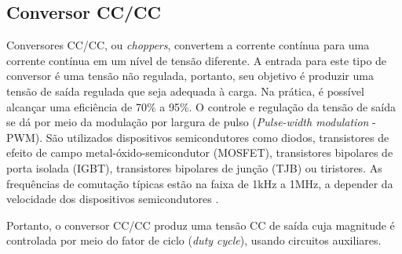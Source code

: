     
    
    
    
    

\subsection{Conversor CC/CC}

Conversores CC/CC, ou \textit{choppers}, convertem a corrente contínua para uma corrente contínua em um nível de tensão diferente. A entrada para este tipo de conversor é uma tensão não regulada, portanto, seu objetivo é produzir uma tensão de saída regulada que seja adequada à carga. Na prática, é possível alcançar uma eficiência de 70\% a 95\%. O controle e regulação da tensão de saída se dá por meio da modulação por largura de pulso (\textit{Pulse-width modulation} - PWM). São utilizados dispositivos semicondutores como diodos, transistores de efeito de campo metal-óxido-semicondutor (MOSFET), transistores bipolares de porta isolada (IGBT), transistores bipolares de junção (TJB) ou tiristores. As frequências de comutação típicas estão na faixa de 1kHz a 1MHz, a depender da velocidade dos dispositivos semicondutores \cite{forward}.

Portanto, o conversor CC/CC produz uma tensão CC de saída cuja magnitude é controlada por meio do fator de ciclo (\textit{duty cycle}), usando circuitos auxiliares. 


